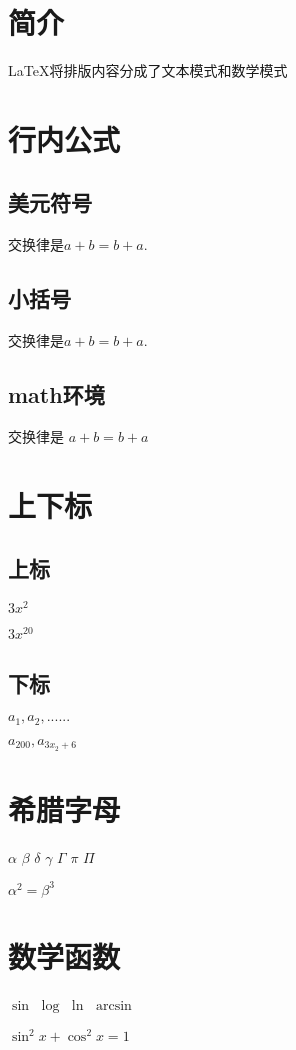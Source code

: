 \documentclass{article}
\begin{document}
    \section{简介}
    \LaTeX{}将排版内容分成了文本模式和数学模式
    \section{行内公式}
    \subsection{美元符号}
    交换律是$a+b=b+a$.
    \subsection{小括号}
    交换律是\(a+b=b+a\).
    \subsection{math环境}
    交换律是 \begin{math}a+b=b+a\end{math}
    \section{上下标}
    \subsection{上标}
    $3x^2$
    
    $3x^{20}$%
    \subsection{下标}
    $a_1, a_2, ......$

    $a_{200}, a_{3x_2+6}$%
    \section{希腊字母}
    $\alpha$
    $\beta$
    $\delta$
    $\gamma$
    $\Gamma$
    $\pi$
    $\Pi$%
    
    $\alpha^2=\beta^3$
    \section{数学函数}
    $\sin$
    $\log$
    $\ln$
    $\arcsin$%
    
    $\sin^2 x+\cos^2 x=1$
    
\end{document}
